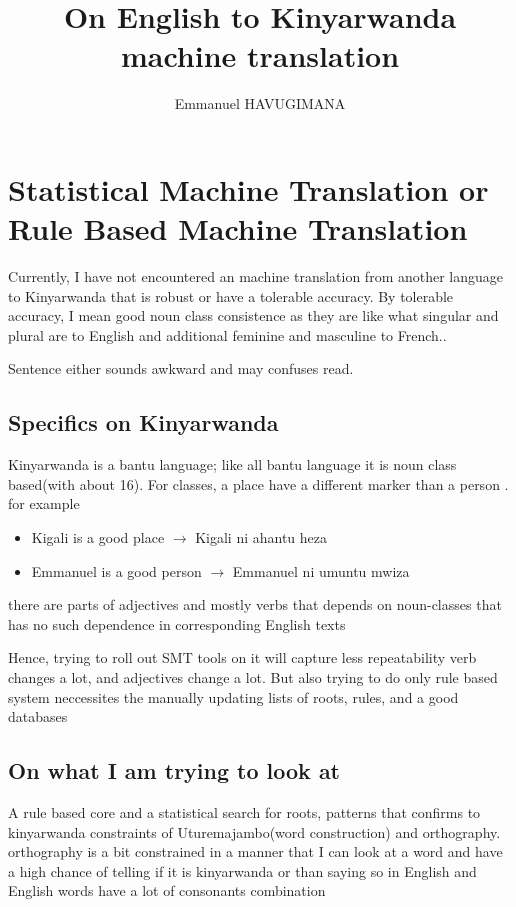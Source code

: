 \documentclass[10pt,a4paper]{article}
\author{Emmanuel HAVUGIMANA}
\title{On English to Kinyarwanda machine translation}
\begin{document}
	\maketitle
\section{Statistical Machine Translation or Rule Based Machine Translation}

Currently, I have not encountered an machine translation from another language to Kinyarwanda that is robust or have a tolerable accuracy. By tolerable accuracy, I mean good noun class consistence as they are like what singular and  plural are to English and additional feminine and masculine to French..

Sentence either sounds awkward and may confuses read.	

\subsection{Specifics on Kinyarwanda}
Kinyarwanda is a bantu language; like all bantu language it is noun class based(with about 16). For classes, a place have a different marker than a person . for example 
\begin{itemize}
	\item Kigali is a good place $\rightarrow$   
	Kigali ni ahantu heza
	\item Emmanuel is a good person $\rightarrow$ Emmanuel ni umuntu mwiza
\end{itemize}

there are parts of adjectives and mostly verbs that depends on noun-classes that has no such dependence in corresponding English texts

Hence, trying to roll out SMT tools on it will capture less repeatability verb changes a lot, and adjectives change a lot.   But also trying to do only rule based system neccessites the manually updating lists of roots, rules, and a good databases


\subsection{On what I am trying to look at}
A rule based core and a statistical search for roots, patterns that confirms to kinyarwanda constraints of Uturemajambo(word construction) and orthography. orthography is a bit constrained in a manner that I can look at a word and have a high chance of telling if it is kinyarwanda or than saying so in English and English words have a lot of consonants combination
\end{document}
